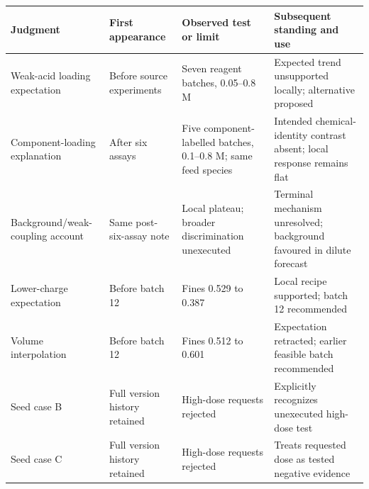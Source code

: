 \documentclass[10pt,a4paper]{article}
\begin{document}
{\def\LTcaptype{table} %
\small\begin{longtable}[]{@{}
  >{\raggedright\arraybackslash}p{}
  >{\raggedright\arraybackslash}p{}
  >{\raggedright\arraybackslash}p{}
  >{\raggedright\arraybackslash}p{}@{}}
\toprule\noalign{}
\begin{minipage}[b]{\linewidth}\raggedright
Judgment
\end{minipage} & \begin{minipage}[b]{\linewidth}\raggedright
First appearance
\end{minipage} & \begin{minipage}[b]{\linewidth}\raggedright
Observed test or limit
\end{minipage} & \begin{minipage}[b]{\linewidth}\raggedright
Subsequent standing and use
\end{minipage} \\
\midrule\noalign{}
\endhead
\bottomrule\noalign{}
\endlastfoot
Weak-acid loading expectation & Before source experiments & Seven reagent batches, 0.05--0.8 M & Expected trend unsupported locally; alternative proposed \\
Component-loading explanation & After six assays & Five component-labelled batches, 0.1--0.8 M; same feed species & Intended chemical-identity contrast absent; local response remains flat \\
Background/weak-coupling account & Same post-six-assay note & Local plateau; broader discrimination unexecuted & Terminal mechanism unresolved; background favoured in dilute forecast \\
Lower-charge expectation & Before batch 12 & Fines 0.529 to 0.387 & Local recipe supported; batch 12 recommended \\
Volume interpolation & Before batch 12 & Fines 0.512 to 0.601 & Expectation retracted; earlier feasible batch recommended \\
Seed case B & Full version history retained & High-dose requests rejected & Explicitly recognizes unexecuted high-dose test \\
Seed case C & Full version history retained & High-dose requests rejected & Treats requested dose as tested negative evidence \\
\end{longtable}\normalsize
}
\end{document}

